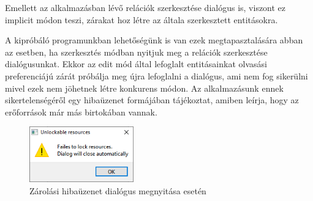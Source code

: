 Emellett az alkalmazásban lévő relációk szerkesztése dialógus is, viszont ez implicit módon teszi, zárakat hoz létre az általa szerkesztett entitásokra.

A kipróbáló programunkban lehetőségünk is van ezek megtapasztalására abban az esetben, ha szerkesztés módban nyitjuk meg a relációk szerkesztése dialógusunkat. Ekkor az edit mód által lefoglalt entitásainkat olvasási preferenciájú zárát próbálja meg újra lefoglalni a dialógus, ami nem fog sikerülni mivel ezek nem jöhetnek létre konkurens módon. Az alkalmazásunk ennek sikertelenségéről egy hibaüzenet formájában tájékoztat, amiben leírja, hogy az erőforrások már más birtokában vannak.

\begin{figure}[H]
	\centering
	\includegraphics[width=0.4\textwidth]{images/Unlockable.png}
	\caption{Zárolási hibaüzenet dialógus megnyitása esetén}
	\label{fig:main_window}
\end{figure}